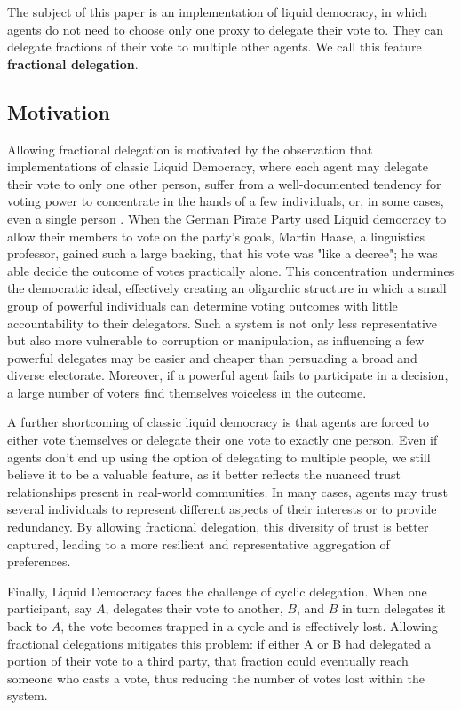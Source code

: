 The subject of this paper is an implementation of liquid democracy, in which agents do not need to choose only one proxy to delegate their vote to. They can delegate fractions of their vote to multiple other agents. We call this feature \textbf{fractional delegation}. 

\subsection{Motivation}
\label{subsec:motivation}

Allowing fractional delegation is motivated by the observation that implementations of classic Liquid Democracy, where each agent may delegate their vote to only one other person, suffer from a well-documented tendency for voting power to concentrate in the hands of a few individuals, or, in some cases, even a single person \cite{klingVotingBehaviourPower2015, caragiannisContributionCritiqueLiquid2019, beckerWhenCanLiquid2021}. When the German Pirate Party used Liquid democracy to allow their members to vote on the party's goals, Martin Haase, a linguistics professor, gained such a large backing, that his vote was "like a decree"; he was able decide the outcome of votes practically alone. \cite{beckerWebPlatformMakes2012} This concentration undermines the democratic ideal, effectively creating an oligarchic structure in which a small group of powerful individuals can determine voting outcomes with little accountability to their delegators. Such a system is not only less representative but also more vulnerable to corruption or manipulation, as influencing a few powerful delegates may be easier and cheaper than persuading a broad and diverse electorate. Moreover, if a powerful agent fails to participate in a decision, a large number of voters find themselves voiceless in the outcome.

A further shortcoming of classic liquid democracy is that agents are forced to either vote themselves or delegate their one vote to exactly one person. Even if agents don't end up using the option of delegating to multiple people, we still believe it to be a valuable feature, as it better reflects the nuanced trust relationships present in real-world communities. In many cases, agents may trust several individuals to represent different aspects of their interests or to provide redundancy. By allowing fractional delegation, this diversity of trust is better captured, leading to a more resilient and representative aggregation of preferences. 

Finally, Liquid Democracy faces the challenge of cyclic delegation. When one participant, say $A$, delegates their vote to another, $B$, and $B$ in turn delegates it back to $A$, the vote becomes trapped in a cycle and is effectively lost. \cite{behrensCircularDelegationsMyth2015} Allowing fractional delegations mitigates this problem: if either A or B had delegated a portion of their vote to a third party, that fraction could eventually reach someone who casts a vote, thus reducing the number of votes lost within the system.

